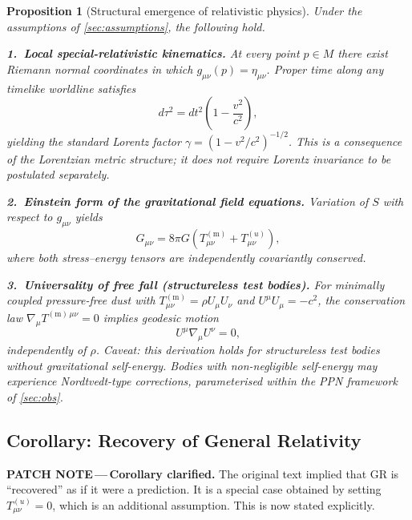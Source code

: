 \documentclass[12pt,a4paper]{article}
\newcommand{\patchnote}[1]{%
  \begin{patchbox}
    {\small\color{patchtext}\textbf{PATCH NOTE\,---\,}#1}
  \end{patchbox}}
\newtheorem{proposition}{Proposition}
\newcommand{\Tmm}{T^{(\mathrm{m})}_{\mu\nu}}
\newcommand{\Tuu}{T^{(u)}_{\mu\nu}}
\begin{document}
\begin{proposition}[Structural emergence of relativistic physics]
\label{prop:main}
Under the assumptions of \cref{sec:assumptions}, the following hold.

\smallskip\noindent
\textbf{1.\ Local special-relativistic kinematics.}
At every point $p\in M$ there exist Riemann normal coordinates in which
$g_{\mu\nu}(p)=\eta_{\mu\nu}$. Proper time along any timelike worldline
satisfies
\begin{equation}
  d\tau^{2}=dt^{2}\!\left(1-\frac{v^{2}}{c^{2}}\right),
\end{equation}
yielding the standard Lorentz factor $\gamma=(1-v^{2}/c^{2})^{-1/2}$. This
is a consequence of the Lorentzian metric structure; it does not require
Lorentz invariance to be postulated separately.

\smallskip\noindent
\textbf{2.\ Einstein form of the gravitational field equations.}
Variation of $S$ with respect to $g_{\mu\nu}$ yields
\begin{equation}
  G_{\mu\nu}=8\pi G\!\left(\Tmm+\Tuu\right),
  \label{eq:field_eqs}
\end{equation}
where both stress--energy tensors are independently covariantly conserved.

\smallskip\noindent
\textbf{3.\ Universality of free fall (structureless test bodies).}
For minimally coupled pressure-free dust with
$\Tmm=\rho U_{\mu}U_{\nu}$ and $U^{\mu}U_{\mu}=-c^{2}$,
the conservation law $\nabla_{\!\mu}T^{(\mathrm{m})\,\mu\nu}=0$ implies
geodesic motion
\begin{equation}
  U^{\mu}\nabla_{\!\mu}U^{\nu}=0,
\end{equation}
independently of $\rho$. \emph{Caveat:} this derivation holds for
structureless test bodies without gravitational self-energy. Bodies with
non-negligible self-energy may experience Nordtvedt-type corrections,
parameterised within the PPN framework of \cref{sec:obs}.
\end{proposition}

\subsection{Corollary: Recovery of General Relativity}

\patchnote{\textbf{Corollary clarified.}
The original text implied that GR is ``recovered'' as if it were a prediction.
It is a special case obtained by setting $\Tuu=0$, which is an additional
assumption. This is now stated explicitly.}
\end{document}
